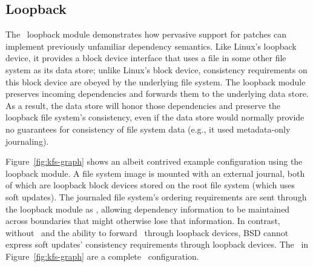 



\subsection{Loopback}
\label{sec:modules:loop}

The \Featherstitch\ loopback module demonstrates how pervasive
support for patches can implement previously unfamiliar dependency
semantics.
%
Like Linux's loopback device, it provides a block device interface that
uses a file in some other file system as its data store; unlike Linux's
block device, consistency requirements on this block device are obeyed by
the underlying file system.
%
The loopback module preserves incoming dependencies and forwards
them to the underlying data store.
%
As a result, the data store will honor those dependencies and preserve the
loopback file system's consistency, even if the data store would normally
provide no guarantees for consistency of file system data (e.g., it used
metadata-only journaling).

Figure~\ref{fig:kfs-graph} shows an albeit contrived example
configuration using the loopback module.
%
A file system image is mounted with an external journal, both of
which are loopback block devices stored on the root file system (which uses
soft updates). The journaled file system's ordering requirements are sent
through the loopback module as \patches, allowing dependency information to be
maintained across boundaries that might otherwise lose that information. In
contrast, without \patches\ and the ability to forward \patches\ through
loopback devices, BSD cannot express soft updates' consistency requirements
through loopback devices. The \modules\ in Figure~\ref{fig:kfs-graph} are a
complete \Kudos\ configuration.


\begin{comment}
\subsection{Asynchronous writes}
\label{sec:modules:unlink}

Finally, we also wrote a trivial module that removes all dependencies from
incoming \patches, allowing the buffer cache to write blocks in any order.
%
This implements similar semantics to existing file systems like ext2 in
asynchronous write mode.
\end{comment}

